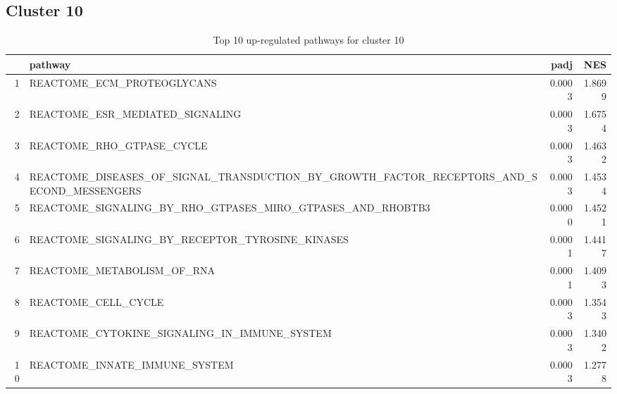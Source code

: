 \documentclass{article}
\begin{document}
\subsection{Cluster 10 }
\begin{table}[H]
\centering
\begin{tabularx}{\textwidth}{rlrr}
  \hline
 & pathway & padj & NES \\ 
  \hline
1 & REACTOME\_ECM\_PROTEOGLYCANS & 0.0003 & 1.8699 \\ 
  2 & REACTOME\_ESR\_MEDIATED\_SIGNALING & 0.0003 & 1.6754 \\ 
  3 & REACTOME\_RHO\_GTPASE\_CYCLE & 0.0003 & 1.4632 \\ 
  4 & REACTOME\_DISEASES\_OF\_SIGNAL\_TRANSDUCTION\_BY\_GROWTH\_FACTOR\_RECEPTORS\_AND\_SECOND\_MESSENGERS & 0.0003 & 1.4534 \\ 
  5 & REACTOME\_SIGNALING\_BY\_RHO\_GTPASES\_MIRO\_GTPASES\_AND\_RHOBTB3 & 0.0000 & 1.4521 \\ 
  6 & REACTOME\_SIGNALING\_BY\_RECEPTOR\_TYROSINE\_KINASES & 0.0001 & 1.4417 \\ 
  7 & REACTOME\_METABOLISM\_OF\_RNA & 0.0001 & 1.4093 \\ 
  8 & REACTOME\_CELL\_CYCLE & 0.0003 & 1.3543 \\ 
  9 & REACTOME\_CYTOKINE\_SIGNALING\_IN\_IMMUNE\_SYSTEM & 0.0003 & 1.3402 \\ 
  10 & REACTOME\_INNATE\_IMMUNE\_SYSTEM & 0.0003 & 1.2778 \\ 
   \hline
\end{tabularx}
\caption{Top 10 up-regulated pathways for cluster 10} 
\label{tab:q3_2_10}
\end{table}
\end{document}

